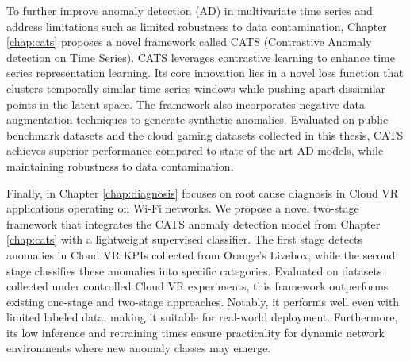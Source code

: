 
To further improve anomaly detection (AD) in multivariate time series and address limitations such as limited robustness to data contamination, Chapter \ref{chap:cats} proposes a novel framework called CATS (Contrastive Anomaly detection on Time Series). CATS leverages contrastive learning to enhance time series representation learning. Its core innovation lies in a novel loss function that clusters temporally similar time series windows while pushing apart dissimilar points in the latent space. The framework also incorporates negative data augmentation techniques to generate synthetic anomalies. Evaluated on public benchmark datasets and the cloud gaming datasets collected in this thesis, CATS achieves superior performance compared to state-of-the-art AD models, while maintaining robustness to data contamination.

Finally, in Chapter \ref{chap:diagnosis} focuses on root cause diagnosis in Cloud VR applications operating on Wi-Fi networks. We propose a novel two-stage framework that integrates the CATS anomaly detection model from Chapter \ref{chap:cats} with a lightweight supervised classifier. The first stage detects anomalies in Cloud VR KPIs collected from Orange's Livebox, while the second stage classifies these anomalies into specific categories.  Evaluated on datasets collected under controlled Cloud VR experiments, this framework outperforms existing one-stage and two-stage approaches. Notably, it performs well even with limited labeled data, making it suitable for real-world deployment. Furthermore, its low inference and retraining times ensure practicality for dynamic network environments where new anomaly classes may emerge.





